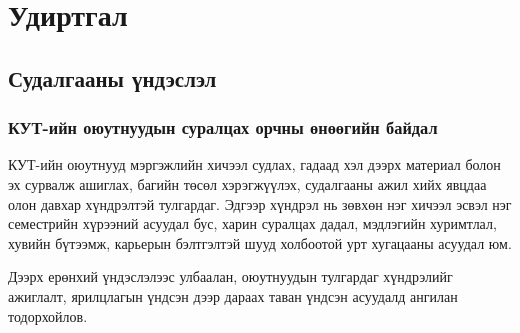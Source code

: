 \chapter{Удиртгал}
\label{ch:introduction}


\section{Судалгааны үндэслэл}

\subsection{КУТ-ийн оюутнуудын суралцах орчны өнөөгийн байдал}

КУТ-ийн оюутнууд мэргэжлийн хичээл судлах, гадаад хэл дээрх материал болон эх сурвалж ашиглах, багийн төсөл хэрэгжүүлэх, судалгааны ажил хийх явцдаа олон давхар хүндрэлтэй тулгардаг. Эдгээр хүндрэл нь зөвхөн нэг хичээл эсвэл нэг семестрийн хүрээний асуудал бус, харин суралцах дадал, мэдлэгийн хуримтлал, хувийн бүтээмж, карьерын бэлтгэлтэй шууд холбоотой урт хугацааны асуудал юм.

Дээрх ерөнхий үндэслэлээс улбаалан, оюутнуудын тулгардаг хүндрэлийг ажиглалт, ярилцлагын үндсэн дээр дараах таван үндсэн асуудалд ангилан тодорхойлов.

